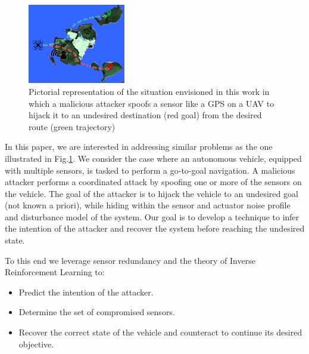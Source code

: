 \documentclass[letterpaper, 10 pt, conference]{ieeeconf}  %
\begin{document}
\begin{figure}[t]
\centering
\includegraphics[width=0.38\textwidth]{problem}
\caption{Pictorial representation of the situation envisioned in this work in which a malicious attacker spoofs a sensor like a GPS on a UAV to hijack it to an undesired destination (red goal) from the desired route (green trajectory)}
 \label{fig:problem}
\end{figure}


In this paper, we are interested in addressing similar problems as the one illustrated in Fig.\ref{fig:problem}. We consider the case where an autonomous vehicle, equipped with multiple sensors, is tasked to perform a go-to-goal navigation. 
A malicious attacker performs a coordinated attack by spoofing one or more of the sensors on the vehicle. The goal of the attacker is to hijack the vehicle to an undesired goal (not known a priori), while hiding within the sensor and actuator noise profile and disturbance model of the system. 
Our goal is to develop a technique to infer the intention of the attacker and recover the system before reaching the undesired state. 


To this end we leverage sensor redundancy and the theory of Inverse Reinforcement Learning to:
\begin{itemize}
    \item Predict the intention of the attacker.
    \item Determine the set of compromised sensors.
    \item Recover the correct state of the vehicle and counteract to continue its desired objective. 
\end{itemize}
\end{document}
